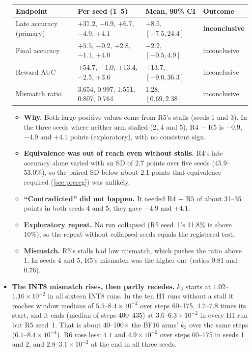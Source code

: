 \documentclass[11pt]{article}
\begin{document}
\begin{itemize}
\smallskip
{\footnotesize
\begin{tabularx}{\linewidth}{@{}l L l l@{}}
\toprule
Endpoint & Per seed (1--5) & Mean, 90\% CI & Outcome\\
\midrule
Late accuracy (primary) & $+37.2$, $-0.9$, $+6.7$, $-4.9$, $+4.1$ & $+8.5$, $[-7.5, 24.4]$ & \textbf{inconclusive}\\
Final accuracy & $+5.5$, $-0.2$, $+2.8$, $-1.1$, $+4.0$ & $+2.2$, $[-0.5, 4.9]$ & inconclusive\\
Reward AUC & $+54.7$, $-1.0$, $+13.4$, $-2.5$, $+3.6$ & $+13.7$, $[-9.0, 36.3]$ & inconclusive\\
Mismatch ratio & 3.654, 0.997, 1.551, 0.807, 0.764 & 1.28, $[0.69, 2.38]$ & inconclusive\\
\bottomrule
\end{tabularx}\par}
  \begin{itemize}
  \item \textbf{Why.} Both large positive values come from R5's stalls (seeds 1 and 3). In the three seeds where neither arm stalled (2, 4 and 5), R4 $-$ R5 is $-0.9$, $-4.9$ and $+4.1$ points (exploratory), with no consistent sign.
  \item \textbf{Equivalence was out of reach even without stalls.} R4's late accuracy alone varied with an SD of 2.7 points over five seeds (45.9--53.0\%), so the paired SD below about 2.1 points that equivalence required (\cref{sec:prereg}) was unlikely.
  \item \textbf{``Contradicted'' did not happen.} It needed R4 $-$ R5 of about 31--35 points in both seeds 4 and 5; they gave $-4.9$ and $+4.1$.
  \item \textbf{Exploratory repeat.} No run collapsed (R5 seed~1's 11.8\% is above 10\%), so the repeat without collapsed seeds equals the registered test.
  \item \textbf{Mismatch.} R5's stalls had low mismatch, which pushes the ratio above 1. In seeds 4 and 5, R5's mismatch was the higher one (ratios 0.81 and 0.76).
  \end{itemize}
\item \textbf{The INT8 mismatch rises, then partly recedes.} $k_3$ starts at $1.02$--$1.16\times10^{-2}$ in all sixteen INT8 runs. In the ten H1 runs without a stall it reaches window medians of $5.5$--$8.4\times10^{-2}$ over steps 60--175, 4.7--7.8 times its start, and it ends (median of steps 400--435) at $3.6$--$6.3\times10^{-2}$ in every H1 run but R5 seed~1. That is about 40--100$\times$ the BF16 arms' $k_3$ over the same steps ($6.1$--$8.4\times10^{-4}$). R6 rose less: $4.1$ and $4.9\times10^{-2}$ over steps 60--175 in seeds 1 and 2, and $2.8$--$3.1\times10^{-2}$ at the end in all three seeds.

\end{itemize}
\end{document}
